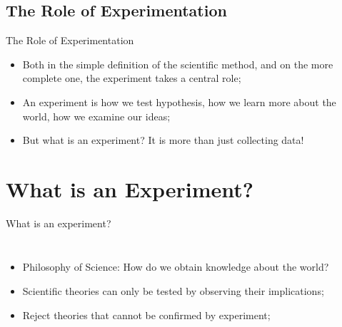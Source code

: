 \documentclass{beamer}
\begin{document}
\begin{CJK}{UTF8}{ipxm}
\subsection{The Role of Experimentation}
\begin{frame}{The Role of Experimentation}
  \begin{itemize}
    \item Both in the simple definition of the scientific method, and on the more complete one, the experiment takes a central role;
    \bigskip

    \item An experiment is how we test hypothesis, how we learn more about the world, how we examine our ideas;
    \bigskip

    \item But what is an experiment? It is more than just collecting data!
  \end{itemize}
\end{frame}


\section{What is an Experiment?}
\begin{frame}{What is an experiment?}
  \begin{columns}[t]
    \begin{itemize}
      \item Philosophy of Science: How do we obtain knowledge about the world?
      \bigskip

      \item Scientific theories can only be tested by observing their implications;
      \bigskip

      \item Reject theories that cannot be confirmed by experiment;
    \end{itemize}


\end{columns}
\end{frame}
\end{CJK}
\end{document}
